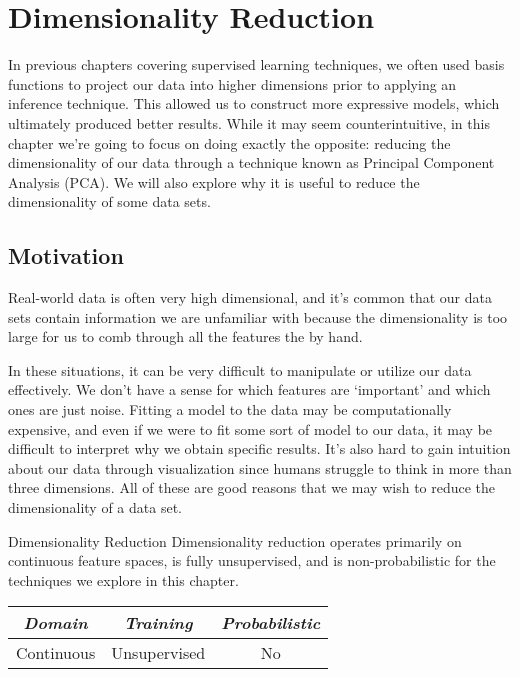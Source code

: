 \chapter{Dimensionality Reduction}
In previous chapters covering supervised learning techniques, we often used basis functions to project our data into higher dimensions prior to applying an inference technique. This allowed us to construct more expressive models, which ultimately produced better results. While it may seem counterintuitive, in this chapter we're going to focus on doing exactly the opposite: reducing the dimensionality of our data through a technique known as Principal Component Analysis (PCA). We will also explore why it is useful to reduce the dimensionality of some data sets.

\section{Motivation}
Real-world data is often very high dimensional, and it's common that our data sets contain information we are unfamiliar with because the dimensionality is too large for us to comb through all the features the by hand.

In these situations, it can be very difficult to manipulate or utilize our data effectively. We don't have a sense for which features are `important' and which ones are just noise. Fitting a model to the data may be computationally expensive, and even if we were to fit some sort of model to our data, it may be difficult to interpret why we obtain specific results. It's also hard to gain intuition about our data through visualization since humans struggle to think in more than three dimensions. All of these are good reasons that we may wish to reduce the dimensionality of a data set.

\begin{mlcube}{Dimensionality Reduction}
Dimensionality reduction operates primarily on continuous feature spaces, is fully unsupervised, and is non-probabilistic for the techniques we explore in this chapter.
\begin{center}
    \begin{tabular}{c|c|c}
    \textit{\textbf{Domain}} & \textit{\textbf{Training}} & \textit{\textbf{Probabilistic}} \\
    \hline
    Continuous & Unsupervised & No \\
    \end{tabular}
\end{center}
\end{mlcube}

